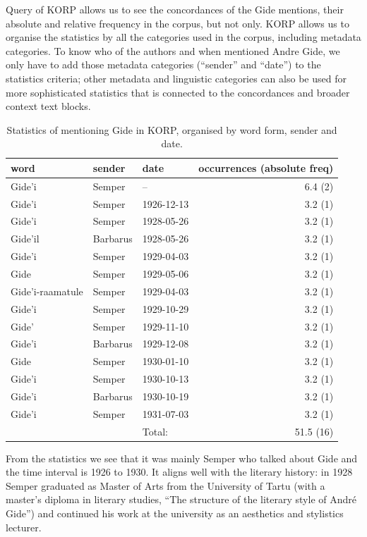 \documentclass[runningheads]{llncs}
\begin{document}
Query of KORP allows us to see the concordances of the Gide mentions, their absolute and relative frequency in the corpus, but not only. KORP allows us to organise the statistics by all the categories used in the corpus, including metadata categories. To know who of the authors and when mentioned Andre Gide, we only have to add those metadata categories (``sender'' and ``date'') to the statistics criteria; other metadata and linguistic categories can also be used for more sophisticated statistics that is connected to the concordances and broader context text blocks. 

\begin{table}
\caption{Statistics of mentioning Gide in KORP, organised by word form, sender and date.}\label{tab1}
\begin{tabular}{| l | l | l | r|}
  \hline
  word & sender & date & occurrences (absolute freq) \\
  \hline
  Gide'i & Semper & -- & 6.4 (2)\\
  Gide'i & Semper & 1926-12-13 & 3.2 (1)\\
  Gide'i & Semper & 1928-05-26 & 3.2 (1)\\
  Gide'il & Barbarus & 1928-05-26 & 3.2 (1)\\
  Gide'i & Semper & 1929-04-03 & 3.2 (1)\\
  Gide & Semper & 1929-05-06 & 3.2 (1)\\
  Gide'i-raamatule & Semper & 1929-04-03 & 3.2 (1)\\
  Gide'i & Semper & 1929-10-29 & 3.2 (1)\\
  Gide' & Semper & 1929-11-10 & 3.2 (1)\\
  Gide'i & Barbarus & 1929-12-08 & 3.2 (1)\\
  Gide & Semper & 1930-01-10 & 3.2 (1)\\
  Gide'i & Semper & 1930-10-13 & 3.2 (1)\\
  Gide'i & Barbarus & 1930-10-19 & 3.2 (1)\\
  Gide'i & Semper & 1931-07-03 & 3.2 (1)\\
  \hline
  &&Total:&51.5 (16)\\
\hline
\end{tabular}
\end{table}


From the statistics we see that it was mainly Semper who talked about Gide and the time interval is 1926 to 1930. It aligns well with the literary history: in 1928 Semper graduated as Master of Arts from the University of Tartu (with a master’s diploma in literary studies, “The structure of the literary style of Andr\'e Gide”) and continued his work at the university as an aesthetics and stylistics lecturer. 
\end{document}
